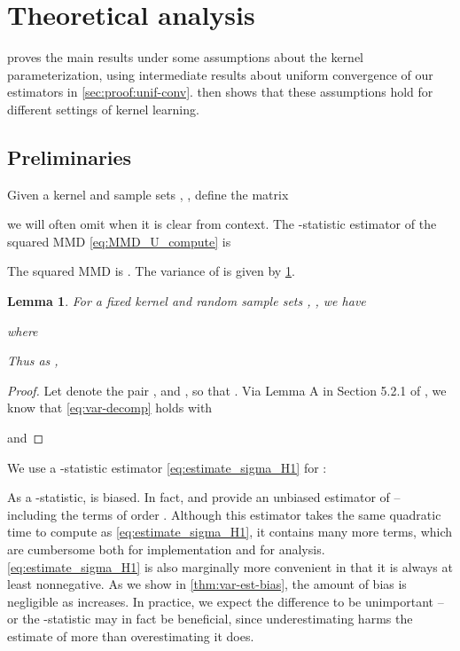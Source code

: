 \documentclass{article}
\newtheorem{lemma}[theorem]{Lemma} \crefname{lemma}{Lemma}{Lemmas}
\begin{document}




\clearpage
\onecolumn
\appendix

\section{Theoretical analysis}\label{Asec:proof}
 proves the main results under some assumptions about the kernel parameterization,
using intermediate results about uniform convergence of our estimators in \cref{sec:proof:unif-conv}.
 then shows that these assumptions hold for different settings of kernel learning.

\subsection{Preliminaries}
Given a kernel  and sample sets , , define the  matrix

we will often omit  when it is clear from context.
The -statistic estimator of the squared MMD \eqref{eq:MMD_U_compute} is

The squared MMD is .
The variance of  is given by \cref{thm:var-decomp}.

\begin{lemma} \label{thm:var-decomp}
    For a fixed kernel  and random sample sets , ,
    we have
    
    where
    
    Thus as ,
    
\end{lemma}
\begin{proof}
Let  denote the pair ,
and ,
so that .
Via Lemma A in Section 5.2.1 of \citet{serfling},
we know that \eqref{eq:var-decomp} holds with

and

\end{proof}

We use a -statistic estimator \eqref{eq:estimate_sigma_H1} for :

As a -statistic,
 is biased.
In fact, \citet{sutherland:mmd-opt} and \citet{unbiased-var-ests} provide an unbiased estimator of  -- including the terms of order .
Although this estimator takes the same quadratic time to compute as \eqref{eq:estimate_sigma_H1},
it contains many more terms, which are cumbersome both for implementation and for analysis.
\eqref{eq:estimate_sigma_H1} is also marginally more convenient in that it is always at least nonnegative.
As we show in \cref{thm:var-est-bias},
the amount of bias is negligible as  increases.
In practice, we expect the difference to be unimportant
-- or the -statistic may in fact be beneficial, since underestimating  harms the estimate of  more than overestimating it does.
\end{document}
